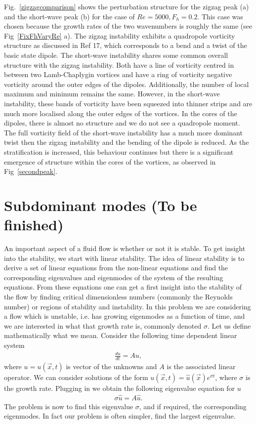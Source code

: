 Fig.~\ref{zigzagcomparison} shows the perturbation structure for the zigzag peak (a) and the short-wave peak (b) for the case of $Re=5000,F_{h}=0.2$. This case was chosen because the growth rates of the two wavenumbers is roughly the same (see Fig~\ref{FixFhVaryRe} a). The zigzag instability exhibits a quadropole vorticity structure as discussed in Ref 17\nocite{bc2000c}, which corresponds to a bend and a twist of the basic state dipole. The short-wave instability shares some common overall structure with the zigzag instability. Both have a line of vorticity centred in between two Lamb-Chaplygin vortices and have a ring of vorticity negative vorticity around the outer edges of the dipoles. Additionally, the number of local maximum and minimum remains the same. However, in the short-wave instability, these bands of vorticity have been squeezed into thinner strips and are much more localised along the outer edges of the vortices. In the cores of the dipoles, there is almost no structure and we do not see a quadropole moment. The full vorticity field of the short-wave instability has a much more dominant twist then the zigzag instability and the bending of the dipole is reduced. As the stratification is increased, this behaviour continues but there is a significant emergence of structure within the cores of the vortices, as observed in Fig~\ref{secondpeak}.


\section{Subdominant modes (To be finished)} 
An important aspect of a fluid flow is whether or not it is stable. To get insight into the stability, we start with linear stability. The idea of linear stability is to derive a set of linear equations from the non-linear equations and find the corresponding eigenvalues and eigenmodes of the system of the resulting equations. From these equations one can get a first insight into the stability of the flow by finding critical dimensionless numbers (commonly the Reynolds number) or regions of stability and instability. In this problem we are considering a flow which is unstable, i.e. has growing eigenmodes as a function of time, and we are interested in what that growth rate is, commonly denoted $\sigma$. Let us define mathematically what we mean. Consider the following time dependent linear system
\begin{align}
\frac{du}{dt} = Au,\label{eig}
\end{align}
where $u=u(\vec{x},t)$ is vector of the unknowns and $A$ is the associated linear operator. We can consider solutions of the form $u(\vec{x},t)=\hat{u}(\vec{x})e^{\sigma t}$, where $\sigma$ is the growth rate. Plugging in we obtain the following eigenvalue equation for $u$
\begin{align}
\sigma \hat{u} = A\hat{u}.
\end{align}
The problem is now to find this eigenvalue $\sigma$, and if required, the corresponding eigenmodes. In fact our problem is often simpler, find the largest eigenvalue.

